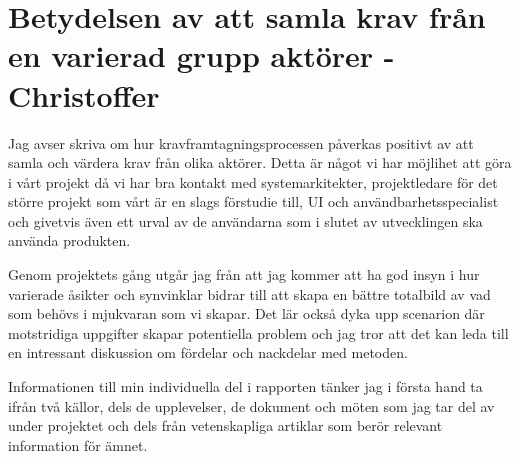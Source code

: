 \chapter{Betydelsen av att samla krav från en varierad grupp aktörer - Christoffer}

Jag avser skriva om hur kravframtagningsprocessen påverkas positivt av att samla och värdera krav från olika aktörer. Detta är något vi har möjlihet att göra i vårt projekt då vi har bra kontakt med systemarkitekter, projektledare för det större projekt som vårt är en slags förstudie till, UI och användbarhetsspecialist och givetvis även ett urval av de användarna som i slutet av utvecklingen ska använda produkten.

Genom projektets gång utgår jag från att jag kommer att ha god insyn i hur varierade åsikter och synvinklar bidrar till att skapa en bättre totalbild av vad som behövs i mjukvaran som vi skapar. Det lär också dyka upp scenarion där motstridiga uppgifter skapar potentiella problem och jag tror att det kan leda till en intressant diskussion om fördelar och nackdelar med metoden.

Informationen till min individuella del i rapporten tänker jag i första hand ta ifrån två källor, dels de upplevelser, de dokument och möten som jag tar del av under projektet och dels från vetenskapliga artiklar som berör relevant information för ämnet.
